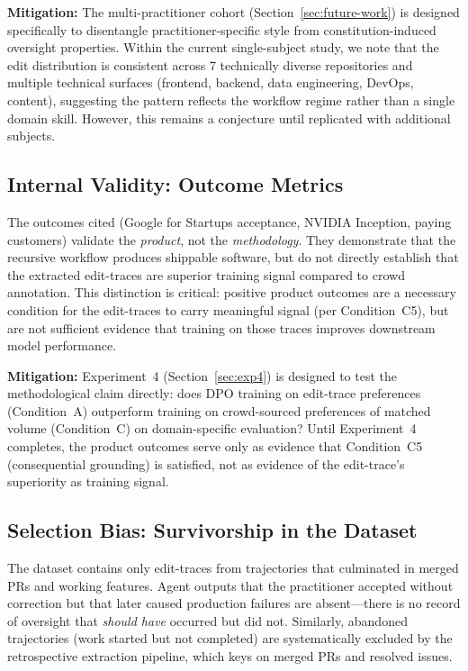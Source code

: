 \documentclass[11pt]{article}
\begin{document}
\textbf{Mitigation:}
The multi-practitioner cohort (Section~\ref{sec:future-work}) is designed specifically to disentangle practitioner-specific style from constitution-induced oversight properties.
Within the current single-subject study, we note that the edit distribution is consistent across 7 technically diverse repositories and multiple technical surfaces (frontend, backend, data engineering, DevOps, content), suggesting the pattern reflects the workflow regime rather than a single domain skill.
However, this remains a conjecture until replicated with additional subjects.

\subsection{Internal Validity: Outcome Metrics}

The outcomes cited (Google for Startups acceptance, NVIDIA Inception, paying customers) validate the \emph{product}, not the \emph{methodology}.
They demonstrate that the recursive workflow produces shippable software, but do not directly establish that the extracted edit-traces are superior training signal compared to crowd annotation.
This distinction is critical: positive product outcomes are a necessary condition for the edit-traces to carry meaningful signal (per Condition~C5), but are not sufficient evidence that training on those traces improves downstream model performance.

\textbf{Mitigation:}
Experiment~4 (Section~\ref{sec:exp4}) is designed to test the methodological claim directly: does DPO training on edit-trace preferences (Condition~A) outperform training on crowd-sourced preferences of matched volume (Condition~C) on domain-specific evaluation?
Until Experiment~4 completes, the product outcomes serve only as evidence that Condition~C5 (consequential grounding) is satisfied, not as evidence of the edit-trace's superiority as training signal.

\subsection{Selection Bias: Survivorship in the Dataset}

The dataset contains only edit-traces from trajectories that culminated in merged PRs and working features.
Agent outputs that the practitioner accepted without correction but that later caused production failures are absent---there is no record of oversight that \emph{should have} occurred but did not.
Similarly, abandoned trajectories (work started but not completed) are systematically excluded by the retrospective extraction pipeline, which keys on merged PRs and resolved issues.
\end{document}
